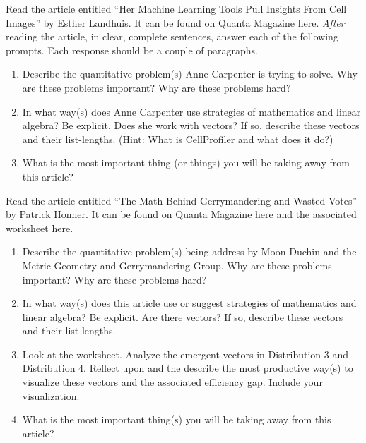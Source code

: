 \begin{problem}
Read the article entitled ``Her Machine Learning Tools Pull Insights From Cell Images'' by Esther Landhuis.  It can be found on \href{https://www.quantamagazine.org/anne-carpenters-ai-tools-pull-insights-from-cell-images-20211102/}{Quanta Magazine here}.  
\textit{After} reading the article, in clear, complete sentences, answer each of the following prompts.  Each response should be a couple of paragraphs.
\begin{enumerate}
\item Describe the quantitative problem(s) Anne Carpenter is trying to solve.  Why are these problems important?  Why are these problems hard?
\item In what way(s) does Anne Carpenter use strategies of mathematics and linear algebra?  Be explicit.  Does she work  with vectors?  If so, describe these vectors and their list-lengths. (Hint: What is CellProfiler and what does it do?)
\item What is the most important thing (or things) you will be taking away from this article?
\end{enumerate}
\end{problem}


\begin{problem}
Read the article entitled ``The Math Behind Gerrymandering and Wasted Votes'' by Patrick Honner.  It can be found on \href{https://www.quantamagazine.org/the-math-behind-gerrymandering-and-wasted-votes-20171012/}{Quanta Magazine here} and the associated worksheet \href{https://simonsfoundation.s3.amazonaws.com/share/QUANTA/2017/DoingThePoliticalMathWorksheet.pdf}{here}.
\begin{enumerate}
\item Describe the quantitative problem(s) being address by Moon Duchin and the Metric Geometry and Gerrymandering Group.  Why are these problems important?  Why are these problems hard?
\item In what way(s) does this article use or suggest strategies of mathematics and linear algebra?  Be explicit.  Are there vectors?  If so, describe these vectors and their list-lengths. 
\item Look at the worksheet.  Analyze the emergent vectors in Distribution 3 and Distribution 4.  Reflect upon and the describe the most productive way(s) to visualize these vectors and the associated efficiency gap.  Include your visualization.
\item What is the most important thing(s) you will be taking away from this article?
\end{enumerate}
\end{problem}